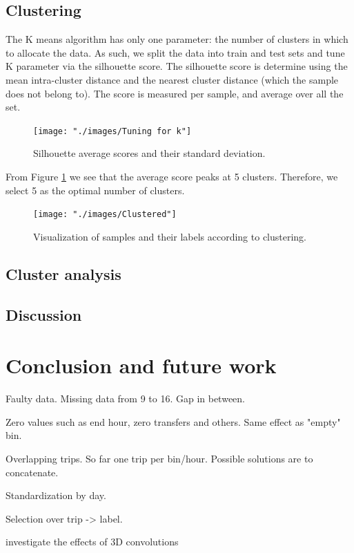 \documentclass{article}
\begin{document}
\subsection{Clustering}
The K means algorithm has only one parameter: the number of clusters in which to allocate the data. As such, we split the data into train and test sets and tune K parameter via the silhouette score. The silhouette score is determine using the mean intra-cluster distance and the nearest cluster distance (which the sample does not belong to). The score is measured per sample, and average over all the set. 

\begin{figure}[H]
  \centering
  \texttt{[image: "./images/Tuning for k"]}
  \caption{Silhouette average scores and their standard deviation.}
  \label{fig:clustering/tuning}
\end{figure}

From Figure \ref{fig:clustering/tuning} we see that the average score peaks at 5 clusters. Therefore, we select 5 as the optimal number of clusters. 

\begin{figure}[H]
  \centering
  \texttt{[image: "./images/Clustered"]}
  \caption{Visualization of samples and their labels according to clustering.}
  \label{fig:clustering/tsne}
\end{figure}

\subsection{Cluster analysis}



\subsection{Discussion}


\newpage
\section{Conclusion and future work}
\label{sec:conclusion}

Faulty data. Missing data from 9 to 16. Gap in between.

Zero values such as end hour, zero transfers and others. Same effect as "empty" bin. 

Overlapping trips. So far one trip per bin/hour. Possible solutions are to concatenate.

Standardization by day.

Selection over trip -> label. 

investigate the effects of 3D convolutions

\newpage
{}

\end{document}
